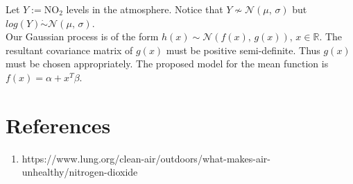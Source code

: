 \documentclass[a4paper, 10pt]{article}
\begin{document}
         Let $Y := \text{NO}_{2}$ levels in the atmosphere. 
         Notice that $Y \not\sim \mathcal{N}(\mu, \, \sigma)$ but $log(Y) \dot{\sim} \mathcal{N}(\mu, \, \sigma)$.\\
         Our Gaussian process is of the form $h(x) \sim \mathcal{N}(f(x), \, g(x)), \, x \in \mathbb{R}$.
         The resultant covariance matrix of $g(x)$ must be positive semi-definite. 
         Thus $g(x)$ must be chosen appropriately.
         The proposed model for the mean function is $f(x) = \alpha + x^{T} \beta$.
   
   \section*{References}
      \begin{enumerate}
         \item https://www.lung.org/clean-air/outdoors/what-makes-air-unhealthy/nitrogen-dioxide
      \end{enumerate}
\end{document}

